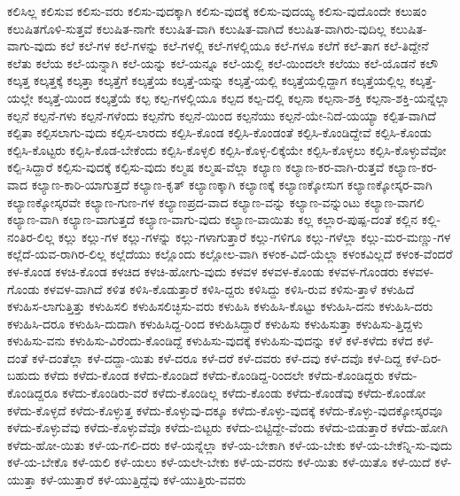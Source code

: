 {ಕಲಿಸಿಲ್ಲ
ಕಲಿಸುವ
ಕಲಿಸು-ವರು
ಕಲಿಸು-ವುದಕ್ಕಾಗಿ
ಕಲಿಸು-ವುದಕ್ಕೆ
ಕಲಿಸು-ವುದಯ್ಯ
ಕಲಿಸು-ವುದೊಂದೇ
ಕಲುಷಂ
ಕಲುಷಿತಗೊಳಿ-ಸುತ್ತವೆ
ಕಲುಷಿತ-ನಾಗೇ
ಕಲುಷಿತ-ವಾಗಿ
ಕಲುಷಿತ-ವಾಗಿದೆ
ಕಲುಷಿತ-ವಾಗಿರು-ವುದಿಲ್ಲ
ಕಲುಷಿತ-ವಾಗು-ವುದು
ಕಲೆ
ಕಲೆ-ಗಳ
ಕಲೆ-ಗಳನ್ನು
ಕಲೆ-ಗಳಲ್ಲಿ
ಕಲೆ-ಗಳಲ್ಲಿಯೂ
ಕಲೆ-ಗಳೂ
ಕಲೆಗೆ
ಕಲೆ-ತಾಗ
ಕಲೆ-ತಿದ್ದೇನೆ
ಕಲೆತು
ಕಲೆಯ
ಕಲೆ-ಯನ್ನಾಗಿ
ಕಲೆ-ಯನ್ನು
ಕಲೆ-ಯನ್ನೂ
ಕಲೆ-ಯಲ್ಲಿ
ಕಲೆ-ಯಿಂದಲೇ
ಕಲೆಯು
ಕಲೆ-ಯೊಡನೆ
ಕಲೌ
ಕಲ್ಕತ್ತ
ಕಲ್ಕತ್ತಕ್ಕೆ
ಕಲ್ಕತ್ತಾ
ಕಲ್ಕತ್ತೆಗೆ
ಕಲ್ಕತ್ತೆಯ
ಕಲ್ಕತ್ತೆ-ಯನ್ನು
ಕಲ್ಕತ್ತೆ-ಯಲ್ಲಿ
ಕಲ್ಕತ್ತೆಯಲ್ಲಿದ್ದಾಗ
ಕಲ್ಕತ್ತೆಯಲ್ಲಿಲ್ಲ
ಕಲ್ಕತ್ತೆ-ಯಲ್ಲೇ
ಕಲ್ಕತ್ತೆ-ಯಿಂದ
ಕಲ್ಕತ್ತೆಯೆ
ಕಲ್ಪ
ಕಲ್ಪ-ಗಳಲ್ಲಿಯೂ
ಕಲ್ಪದ
ಕಲ್ಪ-ದಲ್ಲಿ
ಕಲ್ಪನಾ
ಕಲ್ಪನಾ-ಶಕ್ತಿ
ಕಲ್ಪನಾ-ಶಕ್ತಿ-ಯನ್ನೆಲ್ಲಾ
ಕಲ್ಪನೆ
ಕಲ್ಪನೆ-ಗಳು
ಕಲ್ಪನೆ-ಗಳೆಂದು
ಕಲ್ಪನೆಗು
ಕಲ್ಪನೆ-ಯಿಂದ
ಕಲ್ಪನೆಯು
ಕಲ್ಪನೆ-ಯೇ-ನಿದೆ-ಯಯ್ಯಾ
ಕಲ್ಪಿತ-ವಾಗಿದೆ
ಕಲ್ಪಿತಾ
ಕಲ್ಪಿಸಲಾಗು-ವುದು
ಕಲ್ಪಿಸ-ಲಾರದು
ಕಲ್ಪಿಸಿ-ಕೊಂಡ
ಕಲ್ಪಿಸಿ-ಕೊಂಡಂತೆ
ಕಲ್ಪಿಸಿ-ಕೊಂಡಿದ್ದೇವೆ
ಕಲ್ಪಿಸಿ-ಕೊಂಡು
ಕಲ್ಪಿಸಿ-ಕೊಟ್ಟರು
ಕಲ್ಪಿಸಿ-ಕೊಡ-ಬೇಕೆಂದು
ಕಲ್ಪಿಸಿ-ಕೊಳ್ಳಲಿ
ಕಲ್ಪಿಸಿ-ಕೊಳ್ಳ-ಲಿಕ್ಕೆಯೇ
ಕಲ್ಪಿಸಿ-ಕೊಳ್ಳಲು
ಕಲ್ಪಿಸಿ-ಕೊಳ್ಳುವೆವೋ
ಕಲ್ಪಿ-ಸಿದ್ದಾರೆ
ಕಲ್ಪಿಸು-ವುದಕ್ಕೆ
ಕಲ್ಪಿಸು-ವುದು
ಕಲ್ಮಷ
ಕಲ್ಮಷ-ವೆಲ್ಲಾ
ಕಲ್ಯಾಣ
ಕಲ್ಯಾಣ-ಕರ-ವಾಗಿ-ರುತ್ತವೆ
ಕಲ್ಯಾಣ-ಕರ-ವಾದ
ಕಲ್ಯಾಣ-ಕಾರಿ-ಯಾಗುತ್ತದೆ
ಕಲ್ಯಾಣ-ಕೃತ್
ಕಲ್ಯಾಣಕ್ಕಾಗಿ
ಕಲ್ಯಾಣಕ್ಕೆ
ಕಲ್ಯಾಣಕ್ಕೋಸುಗ
ಕಲ್ಯಾಣಕ್ಕೋಸ್ಕರ-ವಾಗಿ
ಕಲ್ಯಾಣಕ್ಕೋಸ್ಕರವೇ
ಕಲ್ಯಾಣ-ಗುಣ-ಗಳ
ಕಲ್ಯಾಣಪ್ರದ-ವಾದ
ಕಲ್ಯಾಣ-ವನ್ನು
ಕಲ್ಯಾಣ-ವನ್ನುಂಟು
ಕಲ್ಯಾಣ-ವಾಗಲಿ
ಕಲ್ಯಾಣ-ವಾಗಿ
ಕಲ್ಯಾಣ-ವಾಗುತ್ತದೆ
ಕಲ್ಯಾಣ-ವಾಗು-ವುದು
ಕಲ್ಯಾಣ-ವಾಯಿತು
ಕಲ್ಲ
ಕಲ್ಲಾರ-ಪುಷ್ಪ-ದಂತೆ
ಕಲ್ಲಿನ
ಕಲ್ಲಿ-ನಂತಿರ-ಲಿಲ್ಲ
ಕಲ್ಲು
ಕಲ್ಲು-ಗಳ
ಕಲ್ಲು-ಗಳನ್ನು
ಕಲ್ಲು-ಗಳಾಗುತ್ತಾರೆ
ಕಲ್ಲು-ಗಳಿಗೂ
ಕಲ್ಲು-ಗಳೆಲ್ಲಾ
ಕಲ್ಲು-ಮರ-ಮಣ್ಣು-ಗಳ
ಕಲ್ಲೆದೆ-ಯವ-ರಾಗಿರ-ಲಿಲ್ಲ
ಕಲ್ಲೆದೆಯು
ಕಲ್ಲೊಂದು
ಕಲ್ಲೋಲ-ವಾಗಿ
ಕಳಂಕ-ವಿದೆ-ಯೆಲ್ಲಾ
ಕಳಂಕವಿಲ್ಲದೆ
ಕಳಂಕ-ವೆಂದರೆ
ಕಳ-ಕೊಂಡ
ಕಳಚಿ-ಕೊಂಡ
ಕಳಚಿದ
ಕಳಚಿ-ಹೋಗು-ವುದು
ಕಳವಳ
ಕಳವಳ-ಕೊಂಡು
ಕಳವಳ-ಗೊಂಡರು
ಕಳವಳ-ಗೊಂಡು
ಕಳವಳ-ವಾಗಿದೆ
ಕಳಿತ
ಕಳಿಸಿ-ಕೊಡುತ್ತಾರೆ
ಕಳಿಸಿ-ದ್ದರು
ಕಳಿಸಿದ್ದು
ಕಳಿಸಿ-ರುವ
ಕಳಿಸು-ತ್ತಾಳೆ
ಕಳುಹಿದೆ
ಕಳುಹಿಸ-ಲಾಗುತ್ತಿತ್ತು
ಕಳುಹಿಸಲಿ
ಕಳುಹಿಸಲಿಚ್ಛಿಸು-ವರು
ಕಳುಹಿಸಿ
ಕಳುಹಿಸಿ-ಕೊಟ್ಟು
ಕಳುಹಿಸಿ-ದನು
ಕಳುಹಿಸಿ-ದರು
ಕಳುಹಿಸಿ-ದರೂ
ಕಳುಹಿಸಿ-ದುದಾಗಿ
ಕಳುಹಿಸಿದ್ದ-ರಿಂದ
ಕಳುಹಿಸಿದ್ದಾರೆ
ಕಳುಹಿಸು
ಕಳುಹಿಸುತ್ತಾ
ಕಳುಹಿಸು-ತ್ತಿದ್ದಳು
ಕಳುಹಿಸು-ವನು
ಕಳುಹಿಸು-ವಿರೆಂದು-ಕೊಂಡಿದ್ದೆ
ಕಳುಹಿಸು-ವುದಕ್ಕೆ
ಕಳುಹಿಸು-ವುದನ್ನು
ಕಳೆ
ಕಳೆ-ಕಳೆದು
ಕಳೆದ
ಕಳೆ-ದಂತೆ
ಕಳೆ-ದಂತೆಲ್ಲಾ
ಕಳೆ-ದದ್ದಾ-ಯಿತು
ಕಳೆ-ದರೂ
ಕಳೆ-ದರೆ
ಕಳೆ-ದವರು
ಕಳೆ-ದವು
ಕಳೆ-ದವೊ
ಕಳೆ-ದಿದ್ದ
ಕಳೆ-ದಿರ-ಬಹುದು
ಕಳೆದು
ಕಳೆದು-ಕೊಂಡ
ಕಳೆದು-ಕೊಂಡಿದೆ
ಕಳೆದು-ಕೊಂಡಿದ್ದ-ರಿಂದಲೇ
ಕಳೆದು-ಕೊಂಡಿದ್ದರು
ಕಳೆದು-ಕೊಂಡಿದ್ದರೂ
ಕಳೆದು-ಕೊಂಡಿರು-ವರೆ
ಕಳೆದು-ಕೊಂಡಿಲ್ಲ
ಕಳೆದು-ಕೊಂಡು
ಕಳೆದು-ಕೊಂಡೆವು
ಕಳೆದು-ಕೊಂಡೋ
ಕಳೆದು-ಕೊಳ್ಳದೆ
ಕಳೆದು-ಕೊಳ್ಳುತ್ತ
ಕಳೆದು-ಕೊಳ್ಳುವು-ದಕ್ಕೂ
ಕಳೆದು-ಕೊಳ್ಳು-ವುದಕ್ಕೆ
ಕಳೆದು-ಕೊಳ್ಳು-ವುದಕ್ಕೋಸ್ಕರವೂ
ಕಳೆದು-ಕೊಳ್ಳುವೆವು
ಕಳೆದು-ಕೊಳ್ಳುವೆವೊ
ಕಳೆದು-ಬಿಟ್ಟರು
ಕಳೆದು-ಬಿಟ್ಟಿದ್ದೇ-ವೆಂದು
ಕಳೆದು-ಬಿಡುತ್ತಾರೆ
ಕಳೆದು-ಹೋಗಿ
ಕಳೆದು-ಹೋ-ಯಿತು
ಕಳೆ-ಯ-ಗಲಿ-ದರು
ಕಳೆ-ಯನ್ನೆಲ್ಲಾ
ಕಳೆ-ಯ-ಬೇಕಾಗಿ
ಕಳೆ-ಯ-ಬೇಕು
ಕಳೆ-ಯ-ಬೇಕೆನ್ನಿ-ಸು-ವುದು
ಕಳೆ-ಯ-ಬೇಕೊ
ಕಳೆ-ಯಲಿ
ಕಳೆ-ಯಲು
ಕಳೆ-ಯಲೇ-ಬೇಕು
ಕಳೆ-ಯ-ವರನು
ಕಳೆ-ಯಿತು
ಕಳೆ-ಯಿತೊ
ಕಳೆ-ಯಿದೆ
ಕಳೆ-ಯುತ್ತಾ
ಕಳೆ-ಯುತ್ತಾರೆ
ಕಳೆ-ಯುತ್ತಿದ್ದೆವು
ಕಳೆ-ಯುತ್ತಿರು-ವವರು
}
